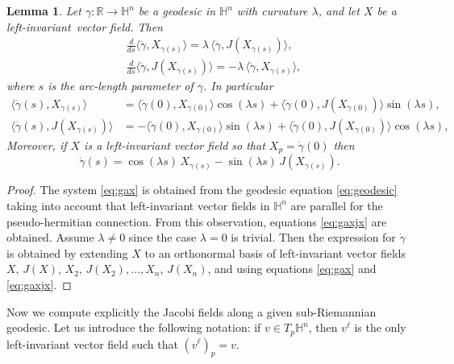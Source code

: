 \documentclass[10pt]{amsart}
\newtheorem{lemma}[theorem]{Lemma}
\theoremstyle{definition}
\theoremstyle{remark}
\numberwithin{equation}{section}
\begin{document}
\begin{lemma}
\label{lem:geocoor}
Let ${\gamma}:{{\mathbb{R}}}\to{{\mathbb{H}}}^n$ be a geodesic in ${{\mathbb{H}}}^n$ with curvature ${\lambda}$, and let $X$ be a
left-invariant~vector field. Then
\begin{equation}
\label{eq:gax}
\begin{split}
&\frac{d}{ds}{\langle{{\dot{\gamma}},X_{{\gamma}(s)}}\rangle}={\lambda}\,{\langle{{\dot{\gamma}},J(X_{{\gamma}(s)})}\rangle}, \\
&\frac{d}{ds}{\langle{{\dot{\gamma}},J(X_{{\gamma}(s)})}\rangle}=-{\lambda}\,{\langle{{\dot{\gamma}},X_{{\gamma}(s)}}\rangle},
\end{split}
\end{equation}
where $s$ is the arc-length parameter of ${\gamma}$. In particular
\begin{equation}
\label{eq:gaxjx}
\begin{split}
{\langle{{\dot{\gamma}}(s),X_{{\gamma}(s)}}\rangle}&={\langle{{\dot{\gamma}}(0),X_{{\gamma}(0)}}\rangle}\cos({\lambda} s)+{\langle{{\dot{\gamma}}(0),J(X_{{\gamma}(0)})}\rangle}\sin({\lambda} s),
\\
{\langle{{\dot{\gamma}}(s),J(X_{{\gamma}(s)})}\rangle}&=-{\langle{{\dot{\gamma}}(0),X_{{\gamma}(0)}}\rangle}\sin({\lambda} s)+{\langle{{\dot{\gamma}}(0),J(X_{{\gamma}(0)})}\rangle}\cos({\lambda} s),
\end{split}
\end{equation}
Moreover, if $X$ is a left-invariant vector field so that
$X_{p}={\dot{\gamma}}(0)$ then
\[
{\dot{\gamma}}(s)=\cos({\lambda} s)\,X_{{\gamma}(s)}-\sin({\lambda} s)\,J(X_{{\gamma}(s)}).
\]
\end{lemma}

\begin{proof}
The system \eqref{eq:gax} is obtained from the geodesic equation \eqref{eq:geodesic} taking into account that left-invariant vector fields in ${{\mathbb{H}}}^n$ are parallel for the pseudo-hermitian connection. From this observation, equations \eqref{eq:gaxjx} are obtained. Assume ${\lambda}\neq 0$ since the case ${\lambda}=0$ is trivial. Then the expression for ${\dot{\gamma}}$ is obtained by extending $X$ to an orthonormal basis of left-invariant vector fields $X$, $J(X)$, $X_{2}$, $J(X_{2}),\ldots, X_{n}$, $J(X_{n})$, and using   equations \eqref{eq:gax} and \eqref{eq:gaxjx}.
\end{proof}

Now we compute explicitly the Jacobi fields along a given sub-Riemannian geodesic. Let us introduce the following notation: if $v\in T_p{{\mathbb{H}}}^n$, then $v^\ell$ is the only left-invariant vector field such that $(v^\ell)_p=v$. 
\end{document}
